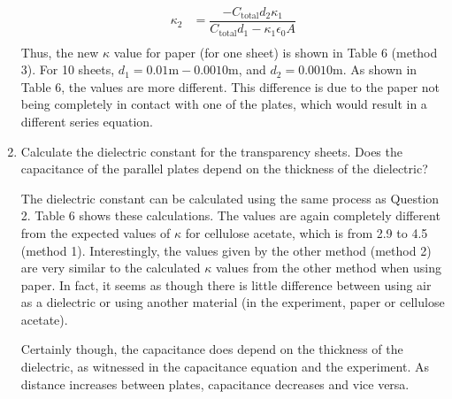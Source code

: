 \documentclass [12pt, letterpaper, twoside] {article}
\begin{document}
\begin{enumerate}
\begin{equation}
\begin{split}
      \kappa_{2} &= \dfrac{-C_{\text{total}}d_{2}\kappa_{1}}{C_{\text{total}}d_{1} - \kappa_{1}\epsilon_{0}A} \\
    \end{split}
  \end{equation}
  Thus, the new \(\kappa\) value for paper (for one sheet) is shown in Table 6 (method 3). For 10 sheets, \(d_{1} = 0.01 \text{m} - 0.0010 \text{m}\), and \(d_{2} = 0.0010 \text{m}\). As shown in Table 6, the values are more different. This difference is due to the paper not being completely in contact with one of the plates, which would result in a different series equation.

  \item Calculate the dielectric constant for the transparency sheets.  Does the capacitance of the parallel plates depend on the thickness of the dielectric?

  The dielectric constant can be calculated using the same process as Question 2. Table 6 shows these calculations. The values are again completely different from the expected values of \(\kappa\) for cellulose acetate, which is from 2.9 to 4.5 (method 1). Interestingly, the values given by the other method (method 2) are very similar to the calculated \(\kappa\) values from the other method when using paper. In fact, it seems as though there is little difference between using air as a dielectric or using another material (in the experiment, paper or cellulose acetate).

  Certainly though, the capacitance does depend on the thickness of the dielectric, as witnessed in the capacitance equation and the experiment. As distance increases between plates, capacitance decreases and vice versa.


\end{enumerate}
\end{document}
